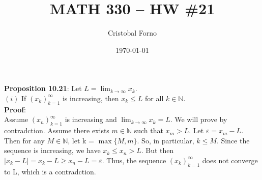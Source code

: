 \documentclass[12pt]{article}
\title{MATH 330 -- HW \#21}
\author{Cristobal Forno}
\date{\today}
\begin{document}
\maketitle

\textbf{Proposition 10.21}: Let $L = \lim_{k\to\infty} x_k.$\\
$(i)$ If $(x_k)_{k=1}^\infty$ is increasing, then $x_k \leq L$ for all $k \in \mathbb{N}$.\\
\noindent
\textbf{Proof}:\\
\indent
Assume $(x_n)_{k=1}^\infty$ is increasing and $\lim_{k\to\infty} x_k = L$. We
will prove by contradction. Assume there exists $m \in \mathbb{N}$ such that $x_m
> L$. Let $\varepsilon = x_m - L$. Then for any $M \in \mathbb{N}$, let k =
$\max\{M, m\}$. So, in particular, $k \leq M$. Since the sequence is increasing,
we have $x_k \leq x_n > L$. But then $|x_k - L| = x_k - L \geq x_n - L =
\varepsilon$. Thus, the sequence $(x_k)_{k=1}^\infty$ does not converge to L,
which is a contradction.
\end{document}
